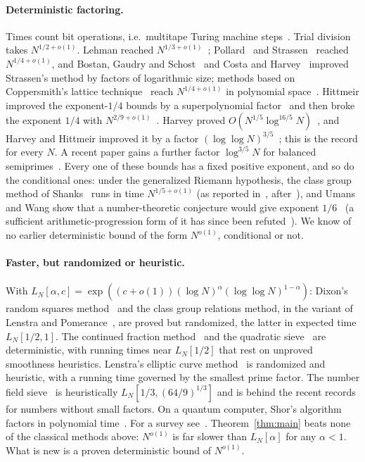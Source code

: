 \documentclass[11pt]{article}
\begin{document}
\paragraph{Deterministic factoring.} Times count bit operations, i.e.\ multitape Turing machine
steps~\cite{Har21}. Trial division takes $N^{1/2+o(1)}$. Lehman reached
$N^{1/3+o(1)}$~\cite{Leh74}; Pollard~\cite{Pol74} and Strassen~\cite{Str77} reached $N^{1/4+o(1)}$, and
Bostan, Gaudry and Schost~\cite{BGS07} and Costa and Harvey~\cite{CH14} improved Strassen's method by
factors of logarithmic size; methods based on Coppersmith's lattice technique~\cite{Cop97} reach $N^{1/4+o(1)}$ in
polynomial space~\cite{Har21}. Hittmeir improved the exponent-$1/4$ bounds by a superpolynomial
factor~\cite{Hit18} and then broke the exponent $1/4$ with $N^{2/9+o(1)}$~\cite{Hit21}. Harvey proved
$O(N^{1/5}\log^{16/5}N)$~\cite{Har21}, and Harvey and Hittmeir improved it by a factor $(\log\log
N)^{3/5}$~\cite{HH22}; this is the record for every $N$. A recent paper gains a further factor $\log^{3/5}N$ for
balanced semiprimes~\cite{GFHP26}. Every one of these bounds has a fixed positive exponent, and so do the
conditional ones: under the generalized Riemann hypothesis, the class group method of Shanks~\cite{Sha71} runs
in time $N^{1/5+o(1)}$ (as reported in~\cite{Har21}, after~\cite[\S5.6.4]{CP05}), and Umans and Wang show that a
number-theoretic conjecture would give exponent $1/6$~\cite{UW25} (a sufficient arithmetic-progression
form of it has since been refuted~\cite{HS26}). We know of no earlier deterministic bound of
the form $N^{o(1)}$, conditional or not.

\paragraph{Faster, but randomized or heuristic.} With $L_N[\alpha,c]=\exp((c+o(1))(\log N)^\alpha(\log\log
N)^{1-\alpha})$: Dixon's random squares method~\cite{Dix81} and the class group relations method, in the
variant of Lenstra and Pomerance~\cite{LP92}, are proved but randomized, the latter in expected time $L_N[1/2,1]$. The continued
fraction method~\cite{MB75} and the quadratic sieve~\cite{Pom82} are deterministic, with running times near
$L_N[1/2]$ that rest on unproved smoothness heuristics. Lenstra's elliptic curve method~\cite{Len87} is
randomized and heuristic, with a running time governed by the smallest prime factor. The number field
sieve~\cite{LL93} is heuristically $L_N[1/3,(64/9)^{1/3}]$ and is behind the recent records for numbers without small factors. On a quantum computer,
Shor's algorithm factors in polynomial time~\cite{Sho94}. For a survey see~\cite{CP05}. Theorem~\ref{thm:main}
beats none of the classical methods above: $N^{o(1)}$
is far slower than $L_N[\alpha]$ for any $\alpha<1$. What is new is a proven deterministic bound of $N^{o(1)}$.
\end{document}
